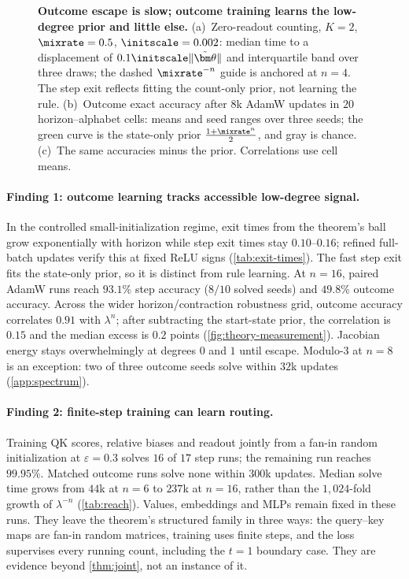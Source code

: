 \begin{figure}[t]
\centering
\resizebox{\linewidth}{!}{}
\caption{\textbf{Outcome escape is slow; outcome training learns the low-degree prior and little else.}
(a)~Zero-readout counting, $K=2$, $\mixrate=0.5$, $\initscale=0.002$: median time to a displacement of $0.1\initscale\|\tilde{\bm\theta}\|$ and interquartile band over three draws; the dashed $\mixrate^{-n}$ guide is anchored at $n=4$. The step exit reflects fitting the count-only prior, not learning the rule.
(b)~Outcome exact accuracy after $8$k AdamW updates in $20$ horizon--alphabet cells: means and seed ranges over three seeds; the green curve is the state-only prior $\frac{1+\mixrate^n}{2}$, and gray is chance.
(c)~The same accuracies minus the prior. Correlations use cell means.}
\label{fig:theory-measurement}
\label{fig:lambda-grid}
\end{figure}

\paragraph{Finding 1: outcome learning tracks accessible low-degree signal.}
In the controlled small-initialization regime, exit times from the theorem's ball grow
exponentially with horizon while step exit times stay $0.10$--$0.16$; refined full-batch
updates verify this at fixed ReLU signs (\cref{tab:exit-times}). The fast step exit fits
the state-only prior, so it is distinct from rule learning. At $n=16$, paired AdamW runs
reach $93.1\%$ step accuracy ($8/10$ solved seeds) and $49.8\%$ outcome accuracy.
Across the wider horizon/contraction robustness grid, outcome accuracy correlates $0.91$ with $\lambda^n$;
after subtracting the start-state prior, the correlation is $0.15$ and the median excess
is $0.2$ points (\cref{fig:theory-measurement}). Jacobian energy stays overwhelmingly at
degrees $0$ and $1$ until escape. Modulo-$3$ at $n=8$ is an exception: two of three
outcome seeds solve within $32$k updates (\cref{app:spectrum}).

\paragraph{Finding 2: finite-step training can learn routing.}
Training QK scores, relative biases and readout jointly from a fan-in random initialization
at $\varepsilon=0.3$ solves $16$ of $17$ step runs; the remaining run reaches $99.95\%$.
Matched outcome runs solve none within $300$k updates. Median solve time grows from
$44$k at $n=6$ to $237$k at $n=16$, rather than the $1{,}024$-fold growth of $\lambda^{-n}$
(\cref{tab:reach}). Values, embeddings and MLPs remain fixed in these runs. They leave the theorem's
structured family in three ways: the query--key maps are fan-in random matrices, training uses finite steps, and the loss
supervises every running count, including the $t=1$ boundary case. They are evidence beyond \cref{thm:joint}, not an instance of it.


